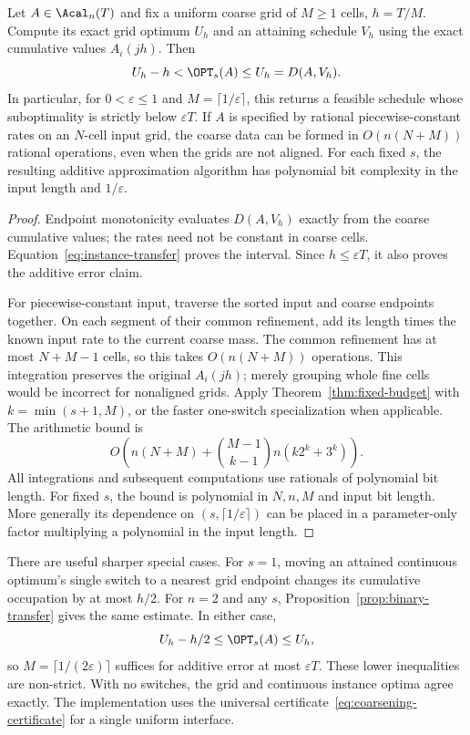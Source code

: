 \begin{theorem}\label{thm:certified-coarsening}
Let $A\in\Acal_n(T)$ and fix a uniform coarse grid of $M\ge1$ cells,
$h=T/M$. Compute its exact grid optimum $U_h$ and an attaining schedule
$V_h$ using the exact cumulative values $A_i(jh)$. Then
\begin{equation}\label{eq:coarsening-certificate}
 U_h-h<\OPT_s(A)\le U_h=D(A,V_h).
\end{equation}
In particular, for $0<\varepsilon\le1$ and $M=\lceil1/\varepsilon\rceil$,
this returns a feasible schedule whose suboptimality is strictly below
$\varepsilon T$. If $A$ is specified by rational piecewise-constant rates
on an $N$-cell input grid, the coarse data can be formed in
$O(n(N+M))$ rational operations, even when the grids are not aligned.
For each fixed $s$, the resulting additive approximation algorithm has
polynomial bit complexity in the input length and $1/\varepsilon$.
\end{theorem}
\begin{proof}
Endpoint monotonicity evaluates $D(A,V_h)$ exactly from the coarse cumulative
values; the rates need not be constant in coarse cells.
Equation~\eqref{eq:instance-transfer} proves the interval. Since
$h\le\varepsilon T$, it also proves the additive error claim.

For piecewise-constant input, traverse the sorted input and coarse endpoints
together. On each segment of their common refinement, add its length times
the known input rate to the current coarse mass. The common refinement has
at most $N+M-1$ cells, so this takes $O(n(N+M))$ operations. This integration
preserves the original $A_i(jh)$; merely grouping whole fine cells would be
incorrect for nonaligned grids. Apply Theorem~\ref{thm:fixed-budget} with
$k=\min(s+1,M)$, or the faster one-switch specialization when applicable.
The arithmetic bound is
\begin{equation}\label{eq:coarsening-complexity}
 O\left(n(N+M)+\binom{M-1}{k-1}n(k2^k+3^k)\right).
\end{equation}
All integrations and subsequent computations use rationals of polynomial
bit length. For fixed $s$, the bound is polynomial in $N,n,M$ and input
bit length. More generally its dependence on $(s,\lceil1/\varepsilon\rceil)$
can be placed in a parameter-only factor multiplying a polynomial in the
input length.
\end{proof}

There are useful sharper special cases. For $s=1$, moving an attained
continuous optimum's single switch to a nearest grid endpoint changes its
cumulative occupation by at most $h/2$. For $n=2$ and any $s$,
Proposition~\ref{prop:binary-transfer} gives the same estimate. In either case,
\[
 U_h-h/2\le\OPT_s(A)\le U_h,
\]
so $M=\lceil1/(2\varepsilon)\rceil$ suffices for additive error at most
$\varepsilon T$. These lower inequalities are non-strict. With no switches,
the grid and continuous instance optima agree exactly. The implementation
uses the universal certificate~\eqref{eq:coarsening-certificate} for a
single uniform interface.

